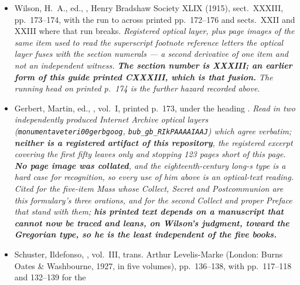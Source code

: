 \begin{itemize}[leftmargin=1.2em, itemsep=0.15em]
Postcommunion); Book~III sect.~X, pp.~229--230 (Collect and Secret, with the
footnote on the Sunday assignment); sect.~XLI, pp.~256--257 (the Secret's
penitential home); p.~237 (the floating series of Postcommunions); sects.~I--XI
for the eleven-Mass run; the preface and introduction for the standing of
Gerbert, Rheinau and S.~Gallen; and the index and marginal chant cues of
Cod.\ Ottobonianus~313. \textit{Registered page-image scan with no text layer;
printed page P is PDF leaf P+93; every quotation above was read on a page
image.}
\item Wilson, H.~A., ed., , Henry Bradshaw Society XLIX (1915), sect.~XXXIII, pp.~173--174, with
the run  to  across printed
pp.~172--176 and sects.~XXII and XXIII where that run breaks.
\textit{Registered optical layer, plus page images of the same item used to
read the superscript footnote reference letters the optical layer fuses with
the section numerals --- a second derivative of one item and not an independent
witness. \textbf{The section number is XXXIII; an earlier form of this guide
printed CXXXIII, which is that fusion.} The running head on printed p.~174 is
the further hazard recorded above.}
\item Gerbert, Martin, ed., ,
vol.~I, printed p.~173, under the heading . \textit{Read in two independently produced Internet Archive
optical layers (\texttt{monumentaveteri00gerbgoog},
\texttt{bub\_gb\_RIkPAAAAIAAJ}) which agree verbatim; \textbf{neither is a
registered artifact of this repository}, the registered excerpt covering the
first fifty leaves only and stopping 123 pages short of this page.
\textbf{No page image was collated}, and the eighteenth-century long-s type is
a hard case for recognition, so every use of him above is an optical-text
reading. Cited for the five-item Mass whose Collect, Secret and Postcommunion
are this formulary's three orations, and for the second Collect and proper
Preface that stand with them; \textbf{his printed text depends on a manuscript
that cannot now be traced and leans, on Wilson's judgment, toward the Gregorian
type, so he is the least independent of the five books.}}
\item Schuster, Ildefonso, ,
vol.~III, trans. Arthur Levelis-Marke (London: Burns Oates \& Washbourne,
1927, in five volumes), pp.~136--138, with pp.~117--118 and 132--139 for the

\end{itemize}
